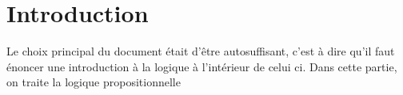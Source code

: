\chapter{Introduction}
Le choix principal du document était d'être autosuffisant, c'est à dire qu'il faut énoncer une introduction à la logique à l'intérieur de celui ci. Dans cette partie, on traite la logique propositionnelle 
